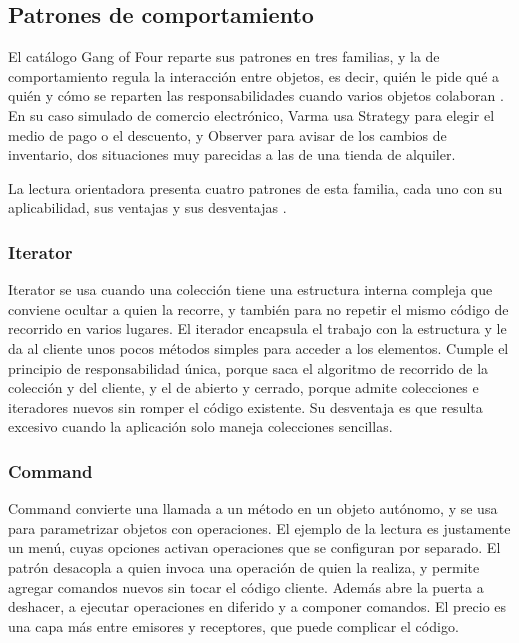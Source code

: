 %
%

\subsection{Patrones de comportamiento}

El catálogo Gang of Four reparte sus patrones en tres familias, y la de comportamiento regula la interacción entre objetos, es decir, quién le pide qué a quién y cómo se reparten las responsabilidades cuando varios objetos colaboran . En su caso simulado de comercio electrónico, Varma usa Strategy para elegir el medio de pago o el descuento, y Observer para avisar de los cambios de inventario, dos situaciones muy parecidas a las de una tienda de alquiler.

La lectura orientadora presenta cuatro patrones de esta familia, cada uno con su aplicabilidad, sus ventajas y sus desventajas .

\subsubsection{Iterator}

Iterator se usa cuando una colección tiene una estructura interna compleja que conviene ocultar a quien la recorre, y también para no repetir el mismo código de recorrido en varios lugares. El iterador encapsula el trabajo con la estructura y le da al cliente unos pocos métodos simples para acceder a los elementos. Cumple el principio de responsabilidad única, porque saca el algoritmo de recorrido de la colección y del cliente, y el de abierto y cerrado, porque admite colecciones e iteradores nuevos sin romper el código existente. Su desventaja es que resulta excesivo cuando la aplicación solo maneja colecciones sencillas.

\subsubsection{Command}

Command convierte una llamada a un método en un objeto autónomo, y se usa para parametrizar objetos con operaciones. El ejemplo de la lectura es justamente un menú, cuyas opciones activan operaciones que se configuran por separado. El patrón desacopla a quien invoca una operación de quien la realiza, y permite agregar comandos nuevos sin tocar el código cliente. Además abre la puerta a deshacer, a ejecutar operaciones en diferido y a componer comandos. El precio es una capa más entre emisores y receptores, que puede complicar el código.

